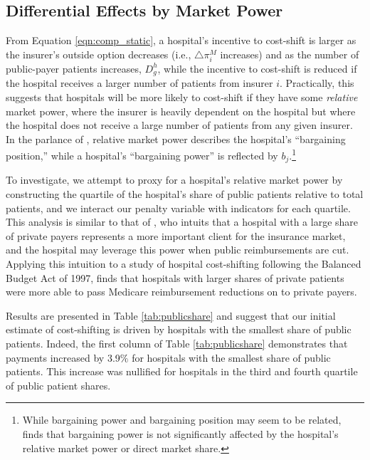 \documentclass[12pt]{article}
\begin{document}
\subsection{Differential Effects by Market Power}
From Equation \ref{eqn:comp_static}, a hospital's incentive to cost-shift is larger as the insurer's outside option decreases (i.e., $\triangle \pi_{i}^{M}$ increases) and as the number of public-payer patients increases, $D_{g}^{h}$, while the incentive to cost-shift is reduced if the hospital receives a larger number of patients from insurer $i$. Practically, this suggests that hospitals will be more likely to cost-shift if they have some \textit{relative} market power, where the insurer is heavily dependent on the hospital but where the hospital does not receive a large number of patients from any given insurer. In the parlance of \cite{lewis2015}, relative market power describes the hospital's ``bargaining position,'' while a hospital's ``bargaining power'' is reflected by $b_{j}$.\footnote{While bargaining power and bargaining position may seem to be related, \cite{lewis2015} finds that bargaining power is not significantly affected by the hospital's relative market power or direct market share.}

To investigate, we attempt to proxy for a hospital's relative market power by constructing the quartile of the hospital's share of public patients relative to total patients, and we interact our penalty variable with indicators for each quartile. This analysis is similar to that of \cite{wu2010}, who intuits that a hospital with a large share of private payers represents a more important client for the insurance market, and the hospital may leverage this power when public reimbursements are cut. Applying this intuition to a study of hospital cost-shifting following the Balanced Budget Act of 1997, \cite{wu2010} finds that hospitals with larger shares of private patients were more able to pass Medicare reimbursement reductions on to private payers.

Results are presented in Table \ref{tab:publicshare} and suggest that our initial estimate of cost-shifting is driven by hospitals with the smallest share of public patients. Indeed, the first column of Table \ref{tab:publicshare} demonstrates that payments increased by 3.9$\%$ for hospitals with the smallest share of public patients. This increase was nullified for hospitals in the third and fourth quartile of public patient shares.
\end{document}
